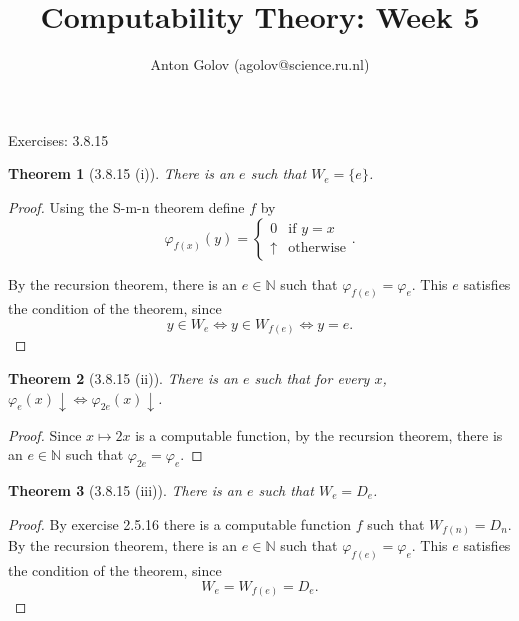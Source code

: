 \documentclass{article}
\title{Computability Theory: Week 5}
\author{Anton Golov (agolov@science.ru.nl)}
\newtheorem{theorem}{Theorem}
\newcommand{\set}[1]{\{ #1 \}}
\newcommand{\terminates}{\!\!\downarrow}
\begin{document}
  \maketitle

  Exercises: 3.8.15

  \begin{theorem}[3.8.15 (i)]
    There is an $e$ such that $W_e = \set{e}$.
  \end{theorem}

  \begin{proof}
    Using the S-m-n theorem define $f$ by
    \[
      \varphi_{f(x)}(y) =
      \begin{cases}
        0 & \text{if $y = x$}\\
        \uparrow & \text{otherwise}
      \end{cases}.
    \]

    By the recursion theorem, there is an $e \in \mathbb{N}$ such that $\varphi_{f(e)} = \varphi_e$.
    This $e$ satisfies the condition of the theorem, since
    \[
      y \in W_e \iff y \in W_{f(e)} \iff y = e.
    \]
  \end{proof}

  \begin{theorem}[3.8.15 (ii)]
    There is an $e$ such that for every $x$, $\varphi_e(x)\terminates \iff \varphi_{2e}(x)\terminates$.
  \end{theorem}

  \begin{proof}
    Since $x \mapsto 2x$ is a computable function, by the recursion theorem, there is an
    $e \in \mathbb{N}$ such that $\varphi_{2e} = \varphi_e$.
  \end{proof}

  \begin{theorem}[3.8.15 (iii)]
    There is an $e$ such that $W_e = D_e$.
  \end{theorem}

  \begin{proof}
    By exercise 2.5.16 there is a computable function $f$ such that $W_{f(n)} = D_n$.  By the
    recursion theorem, there is an $e \in \mathbb{N}$ such that $\varphi_{f(e)} = \varphi_e$.
    This $e$ satisfies the condition of the theorem, since
    \[
      W_e = W_{f(e)} = D_e.
    \]
  \end{proof}
\end{document}
